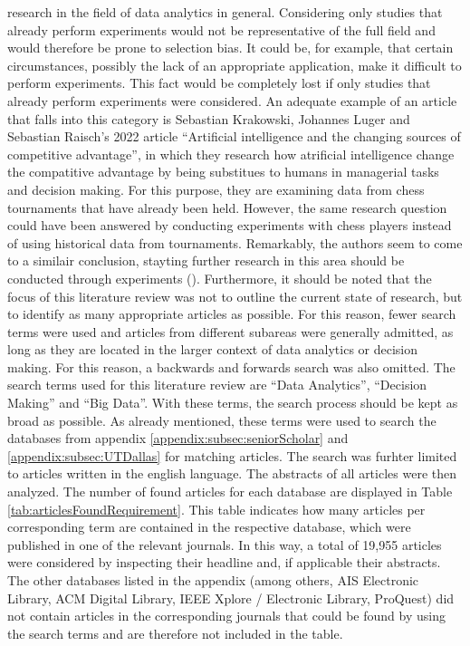 research in the field of data analytics in general. Considering only studies that already perform experiments would not be representative of the full field and would therefore be prone to selection bias. It could be, for example, that certain circumstances, possibly the lack of an appropriate application, make it difficult to perform experiments. This fact would be completely lost if only studies that already perform experiments were considered. An adequate example of an article that falls into this category is Sebastian Krakowski, Johannes Luger and Sebastian Raisch's 2022 article \enquote{Artificial intelligence and the changing sources of competitive advantage}, in which they research how atrificial intelligence change the compatitive advantage by being substitues to humans in managerial tasks and decision making. For this purpose, they are examining data from chess tournaments that have already been held. However, the same research question could have been answered by conducting experiments with chess players instead of using historical data from tournaments. Remarkably, the authors seem to come to a similair conclusion, stayting further research in this area should be conducted through experiments (\cite{Krakowski.2022}). Furthermore, it should be noted that the focus of this literature review was not to outline the current state of research, but to identify as many appropriate articles as possible. For this reason, fewer search terms were used and articles from different subareas were generally admitted, as long as they are located in the larger context of data analytics or decision making. For this reason, a backwards and forwards search was also omitted.
The search terms used for this literature review are \enquote{Data Analytics}, \enquote{Decision Making} and \enquote{Big Data}. With these terms, the search process should be kept as broad as possible. As already mentioned, these terms were used to search the databases from appendix \ref{appendix:subsec:seniorScholar} and \ref{appendix:subsec:UTDallas} for matching articles. The search was furhter limited to articles written in the english language. The abstracts of all articles were then analyzed. The number of found articles for each database are displayed in Table \ref{tab:articlesFoundRequirement}. This table indicates how many articles per corresponding term are contained in the respective database, which were published in one of the relevant journals. In this way, a total of 19,955 articles were considered by inspecting their headline and, if applicable their abstracts. The other databases listed in the appendix (among others, AIS Electronic Library, ACM Digital Library, IEEE Xplore / Electronic Library, ProQuest) did not contain articles in the corresponding journals that could be found by using the search terms and are therefore not included in the table.

